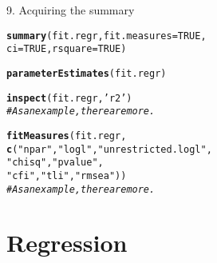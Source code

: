 \documentclass[10pt]{beamer}\usepackage[]{graphicx}\usepackage[]{xcolor}
\makeatletter
\newcommand{\hlnum}[1]{\textcolor[rgb]{0.686,0.059,0.569}{#1}}%
\newcommand{\hlsng}[1]{\textcolor[rgb]{0.192,0.494,0.8}{#1}}%
\newcommand{\hlcom}[1]{\textcolor[rgb]{0.678,0.584,0.686}{\textit{#1}}}%
\newcommand{\hldef}[1]{\textcolor[rgb]{0.345,0.345,0.345}{#1}}%
\newcommand{\hlkwc}[1]{\textcolor[rgb]{0.333,0.667,0.333}{#1}}%
\newcommand{\hlkwd}[1]{\textcolor[rgb]{0.737,0.353,0.396}{\textbf{#1}}}%
\newenvironment{kframe}{%
 \def\at@end@of@kframe{}%
 \ifinner\ifhmode%
  \def\at@end@of@kframe{\end{minipage}}%
  \begin{minipage}{\columnwidth}%
 \fi\fi%
 \def\FrameCommand##1{\hskip\@totalleftmargin \hskip-\fboxsep
 \colorbox{shadecolor}{##1}\hskip-\fboxsep
     \hskip-\linewidth \hskip-\@totalleftmargin \hskip\columnwidth}%
 \MakeFramed {\advance\hsize-\width
   \@totalleftmargin\z@ \linewidth\hsize
   \@setminipage}}%
 {\par\unskip\endMakeFramed%
 \at@end@of@kframe}
\newenvironment{knitrout}{}{} %
\makeatother
\begin{document}
%
\begin{frame}[fragile]{9. Acquiring the summary}

\begin{knitrout}
\color{fgcolor}\begin{kframe}
\begin{alltt}
\hlkwd{summary}\hldef{(fit.regr,} \hlkwc{fit.measures} \hldef{=} \hlnum{TRUE}\hldef{,}
        \hlkwc{ci} \hldef{=} \hlnum{TRUE}\hldef{,} \hlkwc{rsquare} \hldef{=} \hlnum{TRUE}\hldef{)}
\end{alltt}
\end{kframe}
\end{knitrout}

\begin{knitrout}
\color{fgcolor}\begin{kframe}
\begin{alltt}
\hlkwd{parameterEstimates}\hldef{(fit.regr)}

\hlkwd{inspect}\hldef{(fit.regr,} \hlsng{'r2'}\hldef{)}
\hlcom{# As an example, there are more.}

\hlkwd{fitMeasures}\hldef{(fit.regr,}
            \hlkwd{c}\hldef{(}\hlsng{"npar"}\hldef{,} \hlsng{"logl"}\hldef{,} \hlsng{"unrestricted.logl"}\hldef{,}
              \hlsng{"chisq"}\hldef{,} \hlsng{"pvalue"}\hldef{,}
              \hlsng{"cfi"}\hldef{,} \hlsng{"tli"}\hldef{,} \hlsng{"rmsea"}\hldef{))}
\hlcom{# As an example, there are more.}
\end{alltt}
\end{kframe}
\end{knitrout}

\end{frame}
%
\section{Regression}
\end{document}

